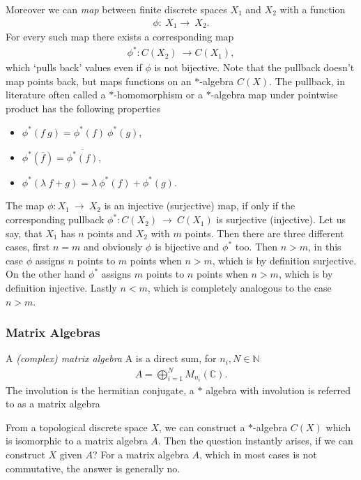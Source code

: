 Moreover we can \textit{map} between finite discrete spaces $X_1$ and $X_2$ with a
function
\begin{align}
    \phi:\ X_1 \rightarrow\ X_2.
\end{align}
For every such map there exists a corresponding map
\begin{align}
    \phi ^*:C(X_2)\ \rightarrow C(X_1),
\end{align}
which `pulls back' values even if $\phi$ is not bijective.
Note that the pullback doesn't map points back, but maps functions on an $*$-algebra $C(X)$.
The pullback, in literature often called a $*$-homomorphism or a $*$-algebra map under
pointwise product has the following properties
\begin{itemize}
    \item $\phi ^*(f\ g) = \phi ^*(f)\ \phi ^*(g)$,
    \item $\phi ^*(\overline{f}) = \overline{\phi ^*(f)}$,
    \item $\phi ^*(\lambda\ f + g) = \lambda\ \phi ^*(f) + \phi ^*(g)$.
\end{itemize}
    The map $\phi :X_1\ \rightarrow \ X_2$ is an injective (surjective) map,
    if only if the corresponding pullback $\phi ^* :C(X_2)\ \rightarrow \
    C(X_1)$ is surjective (injective). Let us say, that $X_1$ has $n$ points and
    $X_2$ with $m$ points. Then there are three different cases, first $n=m$ and
    obviously $\phi$ is bijective and $\phi ^*$ too. Then $n >  m$, in this case
    $\phi$ assigns $n$ points to $m$ points when $n >  m$, which is by definition
    surjective. On the other hand $\phi ^*$ assigns $m$ points to $n$ points when
    $n >  m$, which is by definition injective. Lastly $n < m $, which is
    completely analogous to the case $n > m$.

\subsubsection{Matrix Algebras}
\begin{definition}
    A \textit{(complex) matrix algebra} A is a direct sum, for $n_i, N \in
    \mathbb{N}$
    \begin{align}
        A = \bigoplus _{i=1}^{N} M_{n_i}(\mathbb{C}).
    \end{align}
    The involution is the hermitian conjugate, a $*$ algebra with involution is referred to as
    a matrix algebra
\end{definition}
From a topological discrete space $X$, we can construct a $*$-algebra
$C(X)$ which is isomorphic to a matrix algebra $A$. Then the question instantly
arises, if we can construct $X$ given $A$? For a matrix algebra $A$,
which in most cases is not commutative, the answer is generally no.

